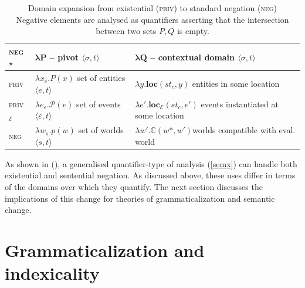 \begin{table}[h]
	\caption[The domains of negative quantifiers]{Domain expansion from existential (\textsc{priv}) to standard negation (\textsc{neg})\\Negative elements are analysed as quantifiers asserting that the intersection between two sets $ P,Q $ is empty.}\centering
	\label{neg*domains}
	\begin{tabular}{m{.5in}m{1.5in}m{2.5in}}
		\multirow{1}{*}{\textsc{\textbf{neg}$ \star $}}&				$ \boldsymbol{\lambda P} $ -- {pivot} $ \langle\sigma,t \rangle$ & $ \boldsymbol{\lambda Q} $ -- contextual domain $\langle \sigma,t\rangle $\\\midrule\midrule
		\textsc{priv}&$ \lambda x_e.P(x) $	\newline
		set of entities $ \langle e,t\rangle $	& 
		$ \lambda y.\textbf{loc}(st_c,y) $\newline
		entities in some location\\\midrule
		\textsc{priv$ _{\mathcal E} $}&				$ \lambda e_\varepsilon.\mathcal P(e) $\newline
		set of events $ \langle\varepsilon,t\rangle  $& $ \lambda e'.\textbf{loc}_\mathcal E(st_c,e') $\newline
		events instantiated at some location\\\midrule
		\textsc{neg} & $ \lambda w_s.p(w) $	\newline
		set of worlds $ \langle s,t\rangle $&$ \lambda w'.\boldsymbol{\mathbb C}(w\!*,  w') $\newline worlds compatible with eval. world\\\bottomrule
	\end{tabular}\linebreak
\end{table}

\noindent As shown in (\lastx), a generalised quantifier-type of analysis (\ref{semx}) can handle both existential and sentential negation. As discussed above, these uses differ in terms of the domains over which they quantify. The next section discusses the implications of this change for theories of grammaticalization and semantic change.


\section{Grammaticalization and indexicality}

